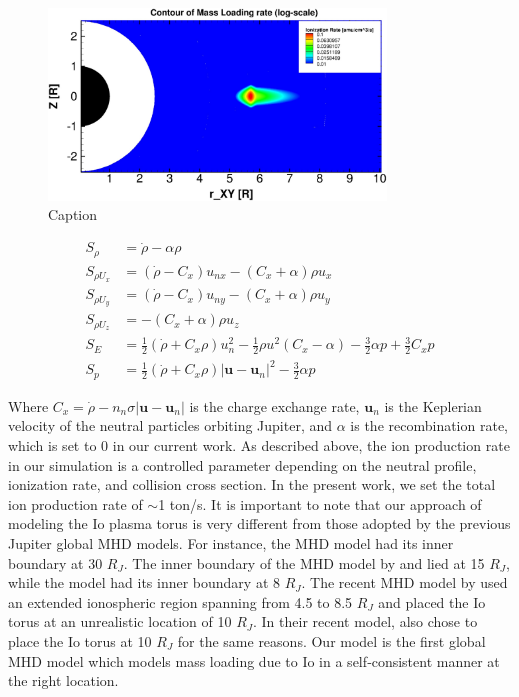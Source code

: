 \begin{figure}
    \centering
    \includegraphics[width=0.8\textwidth]{images2/mass-loading.jpg}
    \caption{Caption}
    \label{fig:mass-loading}
\end{figure}

\begin{align}
    S_\rho & = \dot{\rho} - \alpha \rho \\
    S_{\rho U_x} & = \left(\dot{\rho} - C_x\right) u_{nx} - \left( C_x + \alpha \right) \rho u_x \\
    S_{\rho U_y} & = \left(\dot{\rho} - C_x\right) u_{ny} - \left( C_x + \alpha \right) \rho u_y \\
    S_{\rho U_z} & = -\left( C_x + \alpha \right) \rho u_z \\
    S_E & = \frac{1}{2} \left( \dot{\rho} + C_x \rho \right) u_n^2 - \frac{1}{2} \rho u^2 \left( C_x - \alpha \right) - \frac{3}{2} \alpha p + \frac{3}{2} C_x p \\
    S_p & = \frac{1}{2} \left( \dot{\rho} + C_x \rho \right) \left| \mathbf{u} - \mathbf{u}_n\right|^2 - \frac{3}{2} \alpha p 
\end{align}

Where $C_x = \dot{\rho} - n_n \sigma \left|\mathbf{u} - \mathbf{u}_n\right|$ is the charge exchange rate, $\mathbf{u}_n$ is the Keplerian velocity of the neutral particles orbiting Jupiter, and $\alpha$ is the recombination rate, which is set to 0 in our current work. As described above, the ion production rate in our simulation is a controlled parameter depending on the neutral profile, ionization rate, and collision cross section. In the present work, we set the total ion production rate of $\sim$1 ton/s. It is important to note that our approach of modeling the Io plasma torus is very different from those adopted by the previous Jupiter global MHD models. For instance, the  MHD model had its inner boundary at 30 $R_J$. The inner boundary of the MHD model by  and  lied at 15 $R_J$, while the  model had its inner boundary at 8 $R_J$. The recent MHD model by  used an extended ionospheric region spanning from 4.5 to 8.5 $R_J$ and placed the Io torus at an unrealistic location of 10 $R_J$. In their recent model,  also chose to place the Io torus at 10 $R_J$ for the same reasons. Our model is the first global MHD model which models mass loading due to Io in a self‐consistent manner at the right location.

